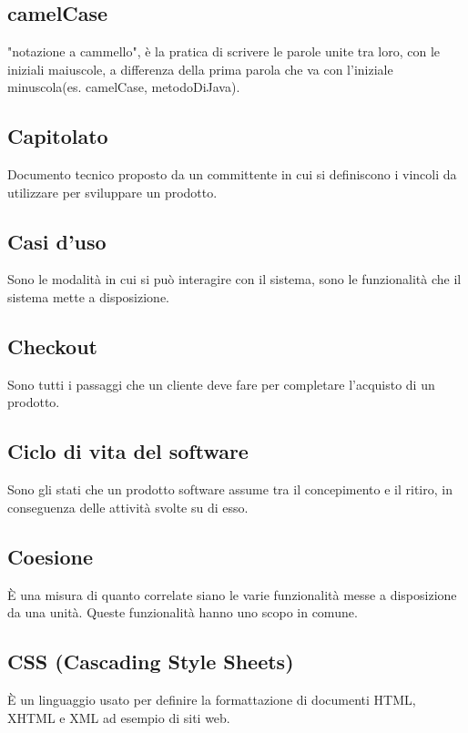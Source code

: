 \section{}

\subsection*{camelCase}
"notazione a cammello", è la pratica di scrivere le parole unite tra loro, con le iniziali maiuscole, a differenza della prima parola che va con l'iniziale minuscola(es. camelCase, metodoDiJava).

\subsection*{Capitolato} Documento tecnico proposto da un committente in cui si definiscono i vincoli da utilizzare per sviluppare un prodotto.

\subsection*{Casi d'uso} Sono le modalità in cui si può interagire con il sistema, sono le funzionalità che il sistema mette a disposizione.

\subsection*{Checkout} Sono tutti i passaggi che un cliente deve fare per completare l'acquisto di un prodotto.

\subsection*{Ciclo di vita del software} Sono gli stati che un prodotto software assume tra il concepimento e il ritiro, in conseguenza delle attività svolte su di esso.

\subsection*{Coesione} È una misura di quanto correlate siano le varie funzionalità messe a disposizione da una unità. Queste funzionalità hanno uno scopo in comune.

\subsection*{CSS (Cascading Style Sheets)} È un linguaggio usato per definire la formattazione di documenti HTML, XHTML e XML ad esempio di siti web.

\newpage